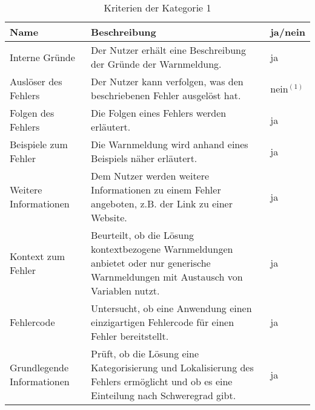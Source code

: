 \begin{table}[htp]
    \centering
    \begin{tabularx}{\columnwidth}{XXl}
        \toprule
        \textbf{Name}              & \textbf{Beschreibung}                                                                                                                & \textbf{ja/nein} \\
        \midrule
        Interne Gründe             & Der Nutzer erhält eine Beschreibung der Gründe der Warnmeldung.                                                                      & ja               \\
        \midrule
        Auslöser des Fehlers       & Der Nutzer kann verfolgen, was den beschriebenen Fehler ausgelöst hat.                                                               & nein$^{(1)}$     \\
        \midrule
        Folgen des Fehlers         & Die Folgen eines Fehlers werden erläutert.                                                                                           & ja               \\
        \midrule
        Beispiele zum Fehler       & Die Warnmeldung wird anhand eines Beispiels näher erläutert.                                                                         & ja               \\
        \midrule
        Weitere Informationen      & Dem Nutzer werden weitere Informationen zu einem Fehler angeboten, z.B. der Link zu einer Website.                                   & ja               \\
        \midrule
        Kontext zum Fehler         & Beurteilt, ob die Lösung kontextbezogene Warnmeldungen anbietet oder nur generische Warnmeldungen mit Austausch von Variablen nutzt. & ja               \\
        \midrule
        Fehlercode                 & Untersucht, ob eine Anwendung einen einzigartigen Fehlercode für einen Fehler bereitstellt.                                          & ja               \\
        \midrule
        Grundlegende Informationen & Prüft, ob die Lösung eine Kategorisierung und Lokalisierung des Fehlers ermöglicht und ob es eine Einteilung nach Schweregrad gibt.  & ja               \\
        \bottomrule
    \end{tabularx}
    \caption{Kriterien der Kategorie 1}
    \label{tbl:criteria-category-1}
\end{table}

